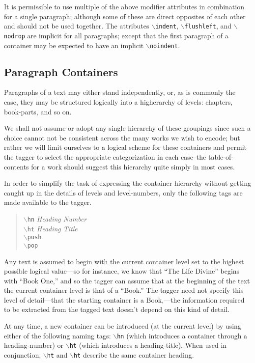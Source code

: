 \documentclass[11pt]{article}
\newcommand{\cmd}[1]{{\tt $\backslash$#1}}
\begin{document}
It is permissible to use multiple of the above modifier attributes in
combination for a single paragraph; although some of these are direct
opposites of each other and should not be used together. The
attributes \cmd{indent}, \cmd{flushleft}, and \cmd{nodrop} are
implicit for all paragraphs; except that the first paragraph of a
container may be expected to have an implicit \cmd{noindent}.


\subsection{Paragraph Containers}

Paragraphs of a text may either stand independently, or, as is
commonly the case, they may be structured logically into a higherarchy
of levels: chapters, book-parts, and so on.

We shall not assume or adopt any single hierarchy of these groupings
since such a choice cannot not be consistent across the many works we
wish to encode; but rather we will limit ourselves to a logical scheme
for these containers and permit the tagger to select the appropriate
categorization in each case--the table-of-contents for a work should
suggest this hierarchy quite simply in most cases.

In order to simplify the task of expressing the container hierarchy
without getting caught up in the details of levels and level-numbers,
only the following tags are made available to the tagger.

\begin{quote}
  \cmd{hn} \emph{Heading Number}\\
  \cmd{ht} \emph{Heading Title}\\
  \cmd{push}\\
  \cmd{pop}
\end{quote}

Any text is assumed to begin with the current container level set to
the highest possible logical value---so for instance, we know that
``The Life Divine'' begins with ``Book One,'' and so the tagger can
assume that at the beginning of the text the current container level
is that of a ``Book.'' The tagger need not specify this level of
detail---that the starting container is a Book,---the information
required to be extracted from the tagged text doesn't depend on this
kind of detail.

At any time, a new container can be introduced (at the current level)
by using either of the following naming tags: \cmd{hn} (which
introduces a container through a heading-number) or \cmd{ht} (which
introduces a heading-title). When used in conjunction, \cmd{ht} and
\cmd{ht} describe the same container heading.
\end{document}
